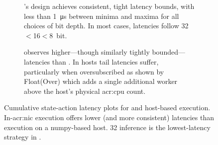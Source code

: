 \begin{figure}
	\centering
	\begin{subfigure}{\linewidth}
		\caption{\approachshort's \Coopfw{} design achieves consistent, tight latency bounds, with less than \qty{1}{\micro\second} between minima and maxima for all choices of bit depth. In most cases, latencies follow 32${}<{}$16${}<{}$\qty{8}{bit}.}
	\end{subfigure}

	\begin{subfigure}{\linewidth}
		\caption{\indfw{} observes higher---though similarly tightly bounded---latencies than \coopfw. In hosts tail latencies suffer, particularly when oversubscribed as shown by Float(Over) which adds a single additional worker above the host's physical \gls{acr:cpu} count.}
	\end{subfigure}
	\caption[Cumulative state-action latency plots for \approachshort{} and host-based execution.]{Cumulative state-action latency plots for \approachshort{} and host-based execution. In-\gls{acr:nic} execution offers lower (and more consistent) latencies than execution on a numpy-based host. \qty{32}{\bit} inference is the lowest-latency strategy in \approachshort{}.\label{fig:lat-cumul}}
\end{figure}


